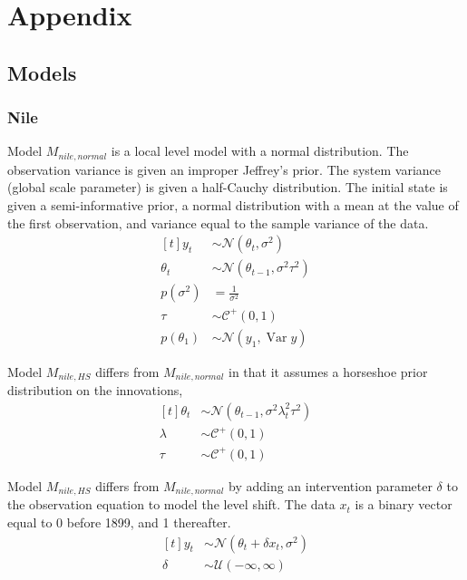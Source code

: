\documentclass{article}
\newcommand{\paren}[1]{\ensuremath{\left(#1\right)}}
\newcommand{\dnorm}[1]{\ensuremath{\mathcal{N}\paren{#1}}}
\newcommand{\dhalfcauchy}[1]{\ensuremath{\mathcal{C}^{+}\paren{#1}}}
\newcommand{\dunif}[1]{\ensuremath{\mathcal{U}\paren{#1}}}
\DeclareMathOperator{\var}{Var}
\begin{document}
\section{Appendix}
\label{sec:appendix}

\subsection{Models}
\label{sec:models}

\subsubsection{Nile}
\label{sec:nile-1}

Model $M_{nile,normal}$ is a local level model with a normal distribution.
The observation variance is given an improper Jeffrey's prior.
The system variance (global scale parameter) is given a half-Cauchy distribution. 
The initial state is given a semi-informative prior, a normal distribution with a mean at the value of the first observation, and variance equal to the sample variance of the data.
\begin{equation}
  \label{eq:11}
  \begin{aligned}[t]
    y_{t} &\sim \dnorm{\theta_{t}, \sigma^{2}} \\
    \theta_{t} &\sim \dnorm{\theta_{t - 1}, \sigma^{2} \tau^{2}} \\
    p(\sigma^{2}) &= \frac{1}{\sigma^{2}} \\
    \tau &\sim \dhalfcauchy{0, 1} \\
    p(\theta_{1}) &\sim \dnorm{y_{1}, \var{y}}
  \end{aligned}
\end{equation}

Model $M_{nile,HS}$ differs from $M_{nile,normal}$ in that it assumes a horseshoe prior distribution on 
the innovations,
\begin{equation}
  \label{eq:18}
  \begin{aligned}[t]
    \theta_{t} &\sim \dnorm{\theta_{t - 1}, \sigma^{2} \lambda_{t}^{2} \tau^{2}} \\
    \lambda &\sim \dhalfcauchy{0, 1} \\
    \tau &\sim \dhalfcauchy{0, 1}
  \end{aligned}
\end{equation}

Model $M_{nile,HS}$ differs from $M_{nile,normal}$ by adding an intervention parameter $\delta$ to the observation equation to model the level shift. 
The data $x_{t}$ is a binary vector equal to 0 before 1899, and 1 thereafter.
\begin{equation}
  \label{eq:18}
  \begin{aligned}[t]
    y_{t} &\sim \dnorm{\theta_{t} + \delta x_{t}, \sigma^{2}} \\
    \delta &\sim \dunif{-\infty, \infty}
  \end{aligned}
\end{equation}

\printbibliography{}
\end{document}
